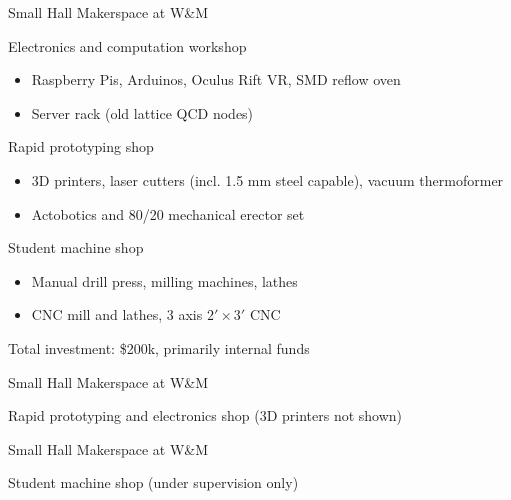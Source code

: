 \documentclass[xcolor={dvipsnames},professionalfonts]{beamer}
\begin{document}
\begin{frame}{Small Hall Makerspace at W\&M}
 \begin{block}{Electronics and computation workshop}
  \begin{itemize}
   \item Raspberry Pis, Arduinos, Oculus Rift VR, SMD reflow oven
   \item Server rack (old lattice QCD nodes)
  \end{itemize}
 \end{block}
 \begin{block}{Rapid prototyping shop}
  \begin{itemize}
   \item 3D printers, laser cutters (incl. 1.5 mm steel capable), vacuum thermoformer
   \item Actobotics and 80/20 mechanical erector set
  \end{itemize}
 \end{block}
 \begin{block}{Student machine shop}
  \begin{itemize}
   \item Manual drill press, milling machines, lathes
   \item CNC mill and lathes, 3 axis $2' \times 3'$ CNC
  \end{itemize}
 \end{block}
 Total investment: \$200k, primarily internal funds
\end{frame}

\begin{frame}{Small Hall Makerspace at W\&M}
 \begin{block}{Rapid prototyping and electronics shop (3D printers not shown)}
 \begin{center}
 \end{center}
 \end{block}
\end{frame}

\begin{frame}{Small Hall Makerspace at W\&M}
 \begin{block}{Student machine shop (under supervision only)}
 \begin{center}
   \quad {}
 \end{center}
 \end{block}
\end{frame}
\end{document}

